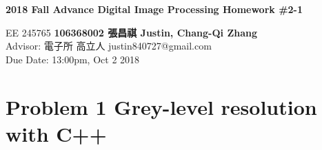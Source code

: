 \documentclass[a4paper, 11pt]{article}
\begin{document}
\noindent
\begin{center}
  \large\textbf{2018 Fall Advance Digital Image Processing Homework \#2-1} \\
\end{center}
\begin{CJK}{UTF8}{bsmi}
\normalsize EE 245765 \hfill \textbf{106368002 張昌祺 Justin, Chang-Qi Zhang} \\
Advisor: 電子所 高立人 \hfill justin840727@gmail.com \\
\null\hfill Due Date: 13:00pm, Oct 2 2018 \\
\end{CJK}

\section*{Problem 1 Grey-level resolution with C++}
\end{document}
